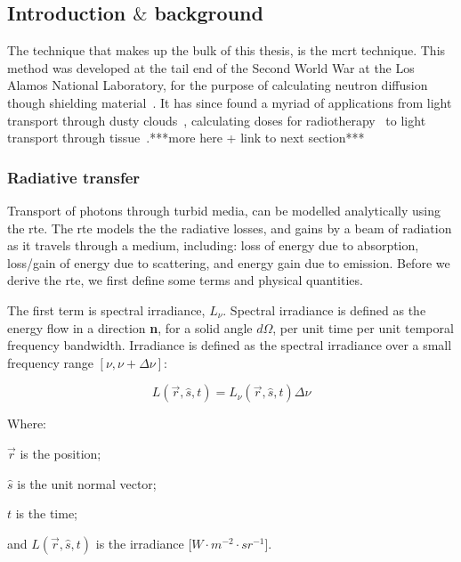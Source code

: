 \subsection{Introduction \texorpdfstring{$\&$}{and} background}%
The technique that makes up the bulk of this thesis, is the \gls{mcrt} technique. This method was developed at the tail end of the Second World War at the Los Alamos National Laboratory, for the purpose of calculating neutron diffusion though shielding material~\cite{montybeg1,eckhardt1987stan,anderson1986metropolis,ulam1947statistical}. It has since found a myriad of applications from light transport through dusty clouds~\cite{wood1999model}, calculating doses for radiotherapy~\cite{rogers1995beam} to light transport through tissue~\cite{1stmonty}.***more here + link to next section***



\subsubsection{Radiative transfer}
Transport of photons through turbid media, can be modelled analytically using the \gls{rte}. The \gls{rte} models the the radiative losses, and gains by a beam of radiation as it travels through a medium, including: loss of energy due to absorption, loss/gain of energy due to scattering, and energy gain due to emission. Before we derive the \gls{rte}, we first define some terms and physical quantities.


The first term is spectral irradiance, $L_\nu$. Spectral irradiance is defined as the energy flow in a direction \textbf{n}, for a solid angle $d\Omega$, per unit time per unit temporal frequency bandwidth.	
Irradiance is defined as the spectral irradiance over a small frequency range $[\nu, \nu+\Delta \nu]$:

\begin{equation}
	L(\vec{r},\hat{s},t) = L_{\nu}(\vec{r},\hat{s},t)\Delta \nu	
\end{equation}

\noindent Where:

\indent $\vec{r}$ is the position;

\indent $\hat{s}$ is the unit normal vector;

\indent $t$ is the time;

\indent and $L(\vec{r},\hat{s},t)$ is the irradiance [$W \cdot m^{-2}\cdot sr^{-1}$].

\medskip

